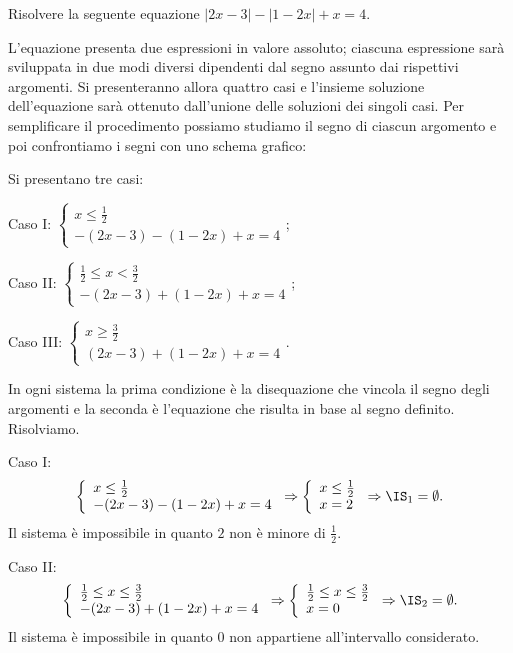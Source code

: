 \begin{exrig}
\begin{esempio}
Risolvere la seguente equazione $\left|2x-3\right|-\left|1-2x\right|+x=4$.

L’equazione presenta due espressioni in valore assoluto; ciascuna espressione sarà sviluppata in due modi diversi dipendenti dal segno assunto dai rispettivi argomenti. Si presenteranno allora quattro casi e l’insieme soluzione dell’equazione sarà ottenuto dall’unione delle soluzioni dei singoli casi. Per semplificare il procedimento possiamo studiamo il segno di ciascun argomento e poi confrontiamo i segni con uno schema grafico:
\begin{center}

\end{center}
Si presentano tre casi:
\begin{itemize*}
\item Caso I: $ \left\{\begin{array}{l}{x\le \frac 1 2}\\{-(2x-3)-(1-2x)+x=4}\end{array}\right. $;
\item Caso II: $ \left\{\begin{array}{l}{\frac 1 2\le x<\frac 3 2}\\{-(2x-3)+(1-2x)+x=4}\end{array}\right. $;
\item Caso III: $ \left\{\begin{array}{l}{x\ge \frac 3 2}\\{(2x-3)+(1-2x)+x=4}\end{array}\right. $.
\end{itemize*}

In ogni sistema la prima condizione è la disequazione che vincola il segno degli argomenti e la seconda è l’equazione che risulta in base al segno definito. Risolviamo.

Caso I: 
\[\left\{\begin{array}{l}x\le \frac 1 2\\-(2x-3)-(1-2x)+x=4\end{array}\right.\Rightarrow \left\{\begin{array}{l}x\le \frac 1 2\\x=2\end{array}\right.\Rightarrow \IS_1=\emptyset .\]
Il sistema è impossibile in quanto $2$ non è minore di $\frac 1 2$.

Caso II: 
\[\left\{\begin{array}{l}\frac 1 2\le x\le \frac 3 2\\-(2x-3)+(1-2x)+x=4\end{array}\right.\Rightarrow \left\{\begin{array}{l}\frac 1 2\le x\le \frac 3 2\\x=0\end{array}\right.\Rightarrow \IS_2=\emptyset .\]
Il sistema è impossibile in quanto 0 non appartiene all'intervallo considerato.


\end{esempio}
\end{exrig}
